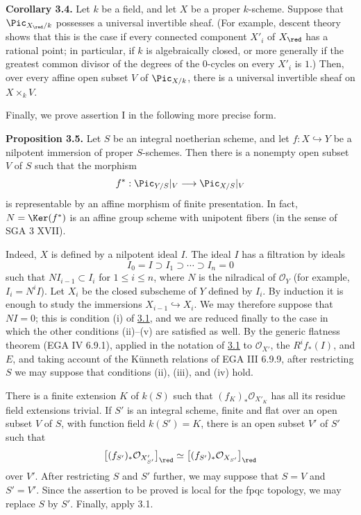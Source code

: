 \textbf{Corollary 3.4.} Let $k$ be a field, and let $X$ be a proper
$k$-scheme. Suppose that $\Pic_{X_{\red}/k}$ possesses a universal
invertible sheaf. (For example, descent theory shows that this is the case
if every connected component $X'_i$ of $X_{\red}$ has a rational point; in
particular, if $k$ is algebraically closed, or more generally if the greatest
common divisor of the degrees of the $0$-cycles on every $X'_i$ is $1$.)
Then, over every affine open subset $V$ of $\Pic_{X/k}$, there is a universal
invertible sheaf on $X\times_kV$.

Finally, we prove assertion I in the following more precise form.

\textbf{Proposition 3.5.} Let $S$ be an integral noetherian scheme, and let
$f:X\hookrightarrow Y$ be a nilpotent immersion of proper $S$-schemes.
Then there is a nonempty open subset $V$ of $S$ such that the morphism
\[
  f^*:\Pic_{Y/S}|_V\longrightarrow\Pic_{X/S}|_V
\]
is representable by an affine morphism of finite presentation. In fact,
$N=\Ker(f^*)$ is an affine group scheme with unipotent fibers (in the sense
of SGA 3 XVII).

Indeed, $X$ is defined by a nilpotent ideal $I$. The ideal $I$ has a
filtration by ideals
\[
  I_0=I\supset I_1\supset\cdots\supset I_n=0
\]
such that $NI_{i-1}\subset I_i$ for $1\leq i\leq n$, where $N$ is the
nilradical of $\mathcal O_Y$ (for example, $I_i=N^iI$). Let $X_i$ be the
closed subscheme of $Y$ defined by $I_i$. By induction it is enough to study
the immersions $X_{i-1}\hookrightarrow X_i$. We may therefore suppose that
$NI=0$; this is condition (i) of \hyperlink{sga6.e12.prop.3-1}{3.1}, and we are reduced finally to the case
in which the other conditions (ii)--(v) are satisfied as well. By the generic
flatness theorem (EGA IV 6.9.1), applied in the notation of \hyperlink{sga6.e12.prop.3-1}{3.1} to
$\mathcal O_{X'}$, the $R^if_*(I)$, and $E$, and taking account of the
K\"unneth relations of EGA III 6.9.9, after restricting $S$ we may suppose
that conditions (ii), (iii), and (iv) hold.

There is a finite extension $K$ of $k(S)$ such that
$(f_K)_*\mathcal O_{X'_K}$ has all its residue field extensions trivial.
If $S'$ is an integral scheme, finite and flat over an open subset $V$ of
$S$, with function field $k(S')=K$, there is an open subset $V'$ of $S'$
such that
\[
  \bigl[(f_{S'})_*\mathcal O_{X'_{S'}}\bigr]_{\red}
  \simeq
  \bigl[(f_{S'})_*\mathcal O_{X_{S'}}\bigr]_{\red}
\]
over $V'$. After restricting $S$ and $S'$ further, we may suppose that
$S=V$ and $S'=V'$. Since the assertion to be proved is local for the fpqc
topology, we may replace $S$ by $S'$. Finally, apply 3.1.

